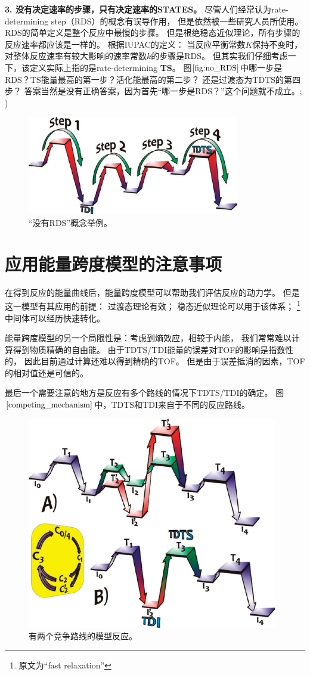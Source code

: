 \documentclass[a4paper,titlepage]{article}
\newcommand*\circled[1]{\tikz[baseline=(char.base)]{
    \node[shape=circle, draw, inner sep=1pt,
        minimum height=12pt] (char) {#1};}}
\begin{document}
\textbf{3. 没有决定速率的步骤，只有决定速率的STATES。}
尽管人们经常认为rate-determining step（RDS）的概念有误导作用，
但是依然被一些研究人员所使用。
RDS的简单定义是整个反应中最慢的步骤。
但是根绝稳态近似理论，所有步骤的反应速率都应该是一样的。
根据IUPAC的定义：
当反应平衡常数$K$保持不变时，对整体反应速率有较大影响的速率常数$k$的步骤是RDS。
但其实我们仔细考虑一下，该定义实际上指的是rate-determining \textbf{TS}。
图$\ref{fig:no_RDS}$中哪一步是RDS？TS能量最高的第一步？活化能最高的第二步？
还是过渡态为TDTS的第四步？
答案当然是没有正确答案，因为首先“哪一步是RDS？”这个问题就不成立。; )
\begin{figure}[H]
  \centering
  \includegraphics[scale=0.5]{no_RDS}
  \caption{“没有RDS”概念举例。}
  \label{fig:no_RDS}
\end{figure}

\section*{应用能量跨度模型的注意事项}
在得到反应的能量曲线后，能量跨度模型可以帮助我们评估反应的动力学。
但是这一模型有其应用的前提：
\circled{1}过渡态理论有效；
\circled{2}稳态近似理论可以用于该体系；
\circled{3}\footnote{原文为“fast relaxation”}中间体可以经历快速转化。

能量跨度模型的另一个局限性是：考虑到熵效应，相较于内能，
我们常常难以计算得到物质精确的自由能。
由于TDTS/TDI能量的误差对TOF的影响是指数性的，
因此目前通过计算还难以得到精确的TOF。
但是由于误差抵消的因素，TOF的相对值还是可信的。

最后一个需要注意的地方是反应有多个路线的情况下TDTS/TDI的确定。
图$\ref{competing_mechanism}$中，TDTS和TDI来自于不同的反应路线。
\begin{figure}[H]
  \centering
  \includegraphics[scale=0.5]{competing_mechanism}
  \caption{有两个竞争路线的模型反应。}
  \label{competing_mechanism}
\end{figure}
\end{document}
